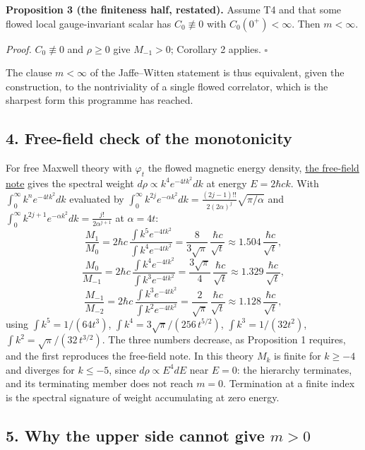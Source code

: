 \documentclass[11pt,a4paper]{article}
\begin{document}
\textbf{Proposition 3 (the finiteness half, restated).} Assume T4 and
that some flowed local gauge-invariant scalar has \(C_0\not\equiv0\)
with \(C_0(0^+)<\infty\). Then \(m<\infty\).

\emph{Proof.} \(C_0\not\equiv0\) and \(\rho\ge0\) give \(M_{-1}>0\);
Corollary 2 applies. \(\square\)

The clause \(m<\infty\) of the Jaffe--Witten statement is thus
equivalent, given the construction, to the nontriviality of a single
flowed correlator, which is the sharpest form this programme has
reached.

\hypertarget{free-field-check-of-the-monotonicity}{%
\subsection{4. Free-field check of the
monotonicity}\label{free-field-check-of-the-monotonicity}}

For free Maxwell theory with \(\varphi_t\) the flowed magnetic energy
density, \href{finiteness-half-flowed-susceptibility.md}{the free-field note} gives
the spectral weight \(d\rho\propto k^4e^{-4tk^2}dk\) at energy
\(E=2\hbar ck\). With \(\int_0^\infty k^ne^{-4tk^2}dk\) evaluated by
\(\int_0^\infty k^{2j}e^{-\alpha k^2}dk=\frac{(2j-1)!!}{2(2\alpha)^j}\sqrt{\pi/\alpha}\)
and \(\int_0^\infty k^{2j+1}e^{-\alpha k^2}dk=\frac{j!}{2\alpha^{j+1}}\)
at \(\alpha=4t\):
\[\frac{M_1}{M_0}=2\hbar c\,\frac{\int k^5e^{-4tk^2}}{\int k^4e^{-4tk^2}}
=\frac{8}{3\sqrt\pi}\,\frac{\hbar c}{\sqrt t}\approx1.504\,\frac{\hbar c}{\sqrt t},\]
\[\frac{M_0}{M_{-1}}=2\hbar c\,\frac{\int k^4e^{-4tk^2}}{\int k^3e^{-4tk^2}}
=\frac{3\sqrt\pi}{4}\,\frac{\hbar c}{\sqrt t}\approx1.329\,\frac{\hbar c}{\sqrt t},\]
\[\frac{M_{-1}}{M_{-2}}=2\hbar c\,\frac{\int k^3e^{-4tk^2}}{\int k^2e^{-4tk^2}}
=\frac{2}{\sqrt\pi}\,\frac{\hbar c}{\sqrt t}\approx1.128\,\frac{\hbar c}{\sqrt t},\]
using \(\int k^5=1/(64t^3)\), \(\int k^4=3\sqrt\pi/(256\,t^{5/2})\),
\(\int k^3=1/(32t^2)\), \(\int k^2=\sqrt\pi/(32\,t^{3/2})\). The three
numbers decrease, as Proposition 1 requires, and the first reproduces
the free-field note. In this theory \(M_k\) is finite for \(k\ge-4\) and
diverges for \(k\le-5\), since \(d\rho\propto E^4dE\) near \(E=0\): the
hierarchy terminates, and its terminating member does not reach \(m=0\).
Termination at a finite index is the spectral signature of weight
accumulating at zero energy.

\hypertarget{why-the-upper-side-cannot-give-m0}{%
\subsection{\texorpdfstring{5. Why the upper side cannot give
\(m>0\)}{5. Why the upper side cannot give m\textgreater0}}\label{why-the-upper-side-cannot-give-m0}}
\end{document}
